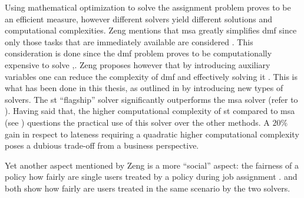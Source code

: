 \documentclass{seal_thesis}
\begin{document}
Using mathematical optimization to solve the assignment problem proves to be an efficient measure, however different solvers yield different solutions and computational complexities. Zeng mentions that \gls{msa} greatly simplifies \gls{dmf} since only those tasks that are immediately available are considered \cite[p. 15]{Zeng2005}. This consideration is done since the \gls{dmf} problem proves to be computationally expensive to solve \cite[p. 13]{Zeng2005},\cite{Garey1990}. Zeng proposes however that by introducing auxiliary variables one can reduce the complexity of \gls{dmf} and effectively solving it \cite[p. 13]{Zeng2005}. This is what has been done in this thesis, as outlined in  by introducing new types of solvers. The \gls{st} ``flagship'' solver significantly outperforms the \gls{msa} solver (refer to ). Having said that, the higher computational complexity of \gls{st} compared to \gls{msa} (see ) questions the practical use of this solver over the other methods. A $20\%$ gain in respect to lateness requiring a quadratic higher computational complexity poses a dubious trade-off from a business perspective.


Yet another aspect mentioned by Zeng is a more ``social'' aspect: the fairness of a policy \ie how fairly are single users treated by a policy during job assignment \cite[pp. 17-18]{Zeng2005}.  and  both show how fairly are users treated in the same scenario by the two solvers.
\end{document}
